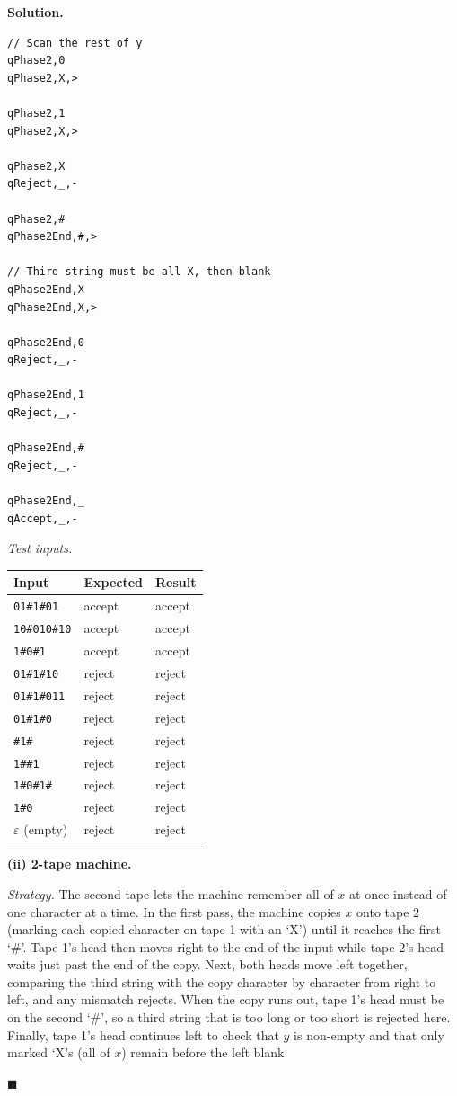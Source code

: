 \documentclass[11pt]{article}
\newenvironment{solution}{%
  \par\noindent\textbf{Solution.}\ \normalfont
}{\hfill$\blacksquare$\par\medskip}
\theoremstyle{plain}
\theoremstyle{definition}
\begin{document}
\begin{solution}
\begin{lstlisting}
// Scan the rest of y
qPhase2,0
qPhase2,X,>

qPhase2,1
qPhase2,X,>

qPhase2,X
qReject,_,-

qPhase2,#
qPhase2End,#,>

// Third string must be all X, then blank
qPhase2End,X
qPhase2End,X,>

qPhase2End,0
qReject,_,-

qPhase2End,1
qReject,_,-

qPhase2End,#
qReject,_,-

qPhase2End,_
qAccept,_,-
\end{lstlisting}

\emph{Test inputs.}
\begin{center}
\begin{tabular}{@{}lll@{}}
\toprule
Input & Expected & Result \\
\midrule
\texttt{01\#1\#01}     & accept & accept \\
\texttt{10\#010\#10}   & accept & accept \\
\texttt{1\#0\#1}       & accept & accept \\
\texttt{01\#1\#10}     & reject & reject \\
\texttt{01\#1\#011}    & reject & reject \\
\texttt{01\#1\#0}      & reject & reject \\
\texttt{\#1\#}         & reject & reject \\
\texttt{1\#\#1}        & reject & reject \\
\texttt{1\#0\#1\#}     & reject & reject \\
\texttt{1\#0}          & reject & reject \\
$\varepsilon$ (empty)  & reject & reject \\
\bottomrule
\end{tabular}
\end{center}

\bigskip
\textbf{(ii) 2-tape machine.}

\emph{Strategy.}
The second tape lets the machine remember all of $x$ at once instead of one character at a time. In the first pass, the machine copies $x$ onto tape 2 (marking each copied character on tape 1 with an `X') until it reaches the first `\#'. Tape 1's head then moves right to the end of the input while tape 2's head waits just past the end of the copy. Next, both heads move left together, comparing the third string with the copy character by character from right to left, and any mismatch rejects. When the copy runs out, tape 1's head must be on the second `\#', so a third string that is too long or too short is rejected here. Finally, tape 1's head continues left to check that $y$ is non-empty and that only marked `X's (all of $x$) remain before the left blank.


\end{solution}
\end{document}

